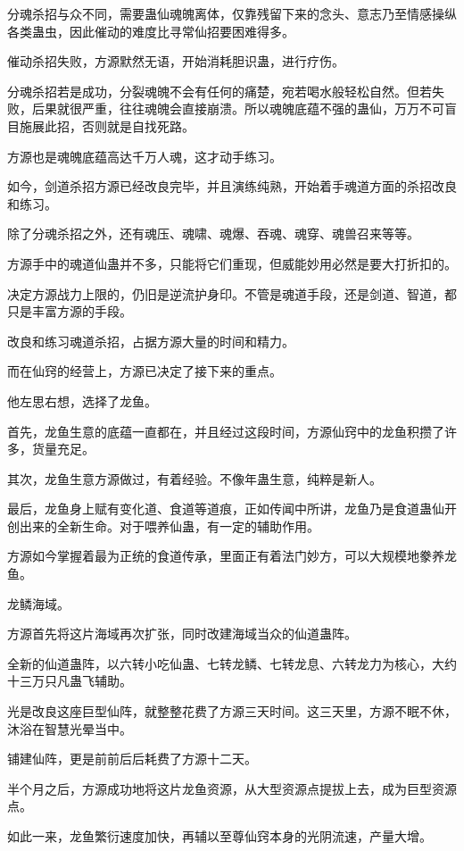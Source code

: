 \begin{this_body}
分魂杀招与众不同，需要蛊仙魂魄离体，仅靠残留下来的念头、意志乃至情感操纵各类蛊虫，因此催动的难度比寻常仙招要困难得多。

催动杀招失败，方源默然无语，开始消耗胆识蛊，进行疗伤。

分魂杀招若是成功，分裂魂魄不会有任何的痛楚，宛若喝水般轻松自然。但若失败，后果就很严重，往往魂魄会直接崩溃。所以魂魄底蕴不强的蛊仙，万万不可盲目施展此招，否则就是自找死路。

方源也是魂魄底蕴高达千万人魂，这才动手练习。

如今，剑道杀招方源已经改良完毕，并且演练纯熟，开始着手魂道方面的杀招改良和练习。

除了分魂杀招之外，还有魂压、魂啸、魂爆、吞魂、魂穿、魂兽召来等等。

方源手中的魂道仙蛊并不多，只能将它们重现，但威能妙用必然是要大打折扣的。

决定方源战力上限的，仍旧是逆流护身印。不管是魂道手段，还是剑道、智道，都只是丰富方源的手段。

改良和练习魂道杀招，占据方源大量的时间和精力。

而在仙窍的经营上，方源已决定了接下来的重点。

他左思右想，选择了龙鱼。

首先，龙鱼生意的底蕴一直都在，并且经过这段时间，方源仙窍中的龙鱼积攒了许多，货量充足。

其次，龙鱼生意方源做过，有着经验。不像年蛊生意，纯粹是新人。

最后，龙鱼身上赋有变化道、食道等道痕，正如传闻中所讲，龙鱼乃是食道蛊仙开创出来的全新生命。对于喂养仙蛊，有一定的辅助作用。

方源如今掌握着最为正统的食道传承，里面正有着法门妙方，可以大规模地豢养龙鱼。

龙鳞海域。

方源首先将这片海域再次扩张，同时改建海域当众的仙道蛊阵。

全新的仙道蛊阵，以六转小吃仙蛊、七转龙鳞、七转龙息、六转龙力为核心，大约十三万只凡蛊飞辅助。

光是改良这座巨型仙阵，就整整花费了方源三天时间。这三天里，方源不眠不休，沐浴在智慧光晕当中。

铺建仙阵，更是前前后后耗费了方源十二天。

半个月之后，方源成功地将这片龙鱼资源，从大型资源点提拔上去，成为巨型资源点。

如此一来，龙鱼繁衍速度加快，再辅以至尊仙窍本身的光阴流速，产量大增。


\end{this_body}
